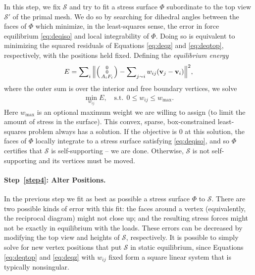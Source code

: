\documentclass[review]{acmsiggraph}
\makeatletter
\def\Forcevector{\Big(\mbox{\scriptsize
	\def\arraystretch{0.8}\begin{tabular}{@{\,}c@{\,}}
	0 \\ 0 \\ $A_i F_i$
	\end{tabular}}\Big)}
\def\SS{{\mathcal S}}
\makeatother
\begin{document}
In this step, we fix $\SS$ and try to fit a stress surface $\Phi$ 
subordinate to the top view $\SS'$ of the primal mesh. We do so by 
searching for dihedral angles between the faces of $\Phi$ which minimize, 
in the least-squares sense, the error in force equilibrium 
\eqref{eq:deqiso} and local integrability of $\Phi$. Doing so is 
equivalent to minimizing the squared residuals of Equations 
\eqref{eq:deqz} and \eqref{eq:deqtop}, respectively, with the positions 
held fixed. Defining the {\em equilibrium energy}
	\begin{align}
	E = \sum\nolimits_i \Big\| \Forcevector -
		\sum\nolimits_{j\sim i} w_{ij} (\vw_j-\vw_i) \Big\|^2,
	\label{eq:eenergy}
	\end{align}
 where the outer sum is over the interior and free boundary vertices,
we solve
	\begin{align}
	\min_{w_{ij}} E,
	\quad
	\textrm{s.t.}\ \
		0 \leq w_{ij} \leq w_{\max}.
	\label{eq:wbounds}
	\end{align}
 Here $w_{\max}$ is an optional maximum weight we are willing to assign 
(to limit the amount of stress in the surface). This convex, sparse, 
box-constrained least-squares problem \cite{BCLS} always has a solution. 
If the objective is $0$ at this solution, the faces of $\Phi$ locally 
integrate to a stress surface satisfying \eqref{eq:deqiso}, and so $\Phi$ 
certifies that $\SS$ is self-supporting -- we are done. Otherwise, $\SS$ 
is not self-supporting and its vertices must be moved.

\paragraph{Step~\ref{step4}: Alter Positions.} In the previous step we fit 
as best as possible a stress surface $\Phi$ to $\SS$. There are two 
possible kinds of error with this fit: the faces around a vertex 
(equivalently, the reciprocal diagram) might not close up; and the 
resulting stress forces might not be exactly in equilibrium with the 
loads. These errors can be decreased by modifying the top view and heights 
of $\SS$, respectively. It is possible to simply solve for new vertex 
positions that put $\SS$ in static equilibrium, since Equations 
\eqref{eq:deqtop} and \eqref{eq:deqz} with $w_{ij}$ fixed form a square 
linear system that is typically nonsingular.
\end{document}
